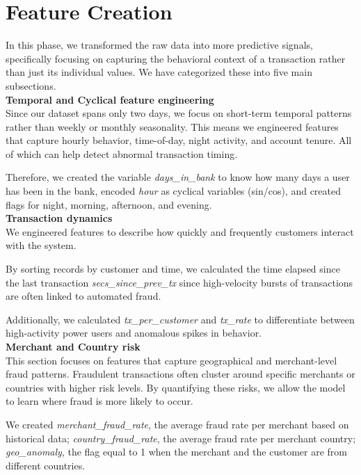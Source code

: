 \documentclass[12pt,a4paper]{report}
\begin{document}
\section{Feature Creation}
In this phase, we transformed the raw data into more predictive signals, specifically focusing on capturing the behavioral context of a transaction rather than just its individual values. We have categorized these into five  main subsections.\\

\textbf{Temporal and Cyclical feature engineering}\\
Since our dataset spans only two days, we focus on short-term temporal patterns rather than weekly or monthly seasonality. This means we engineered features that capture hourly behavior, time-of-day, night activity, and account tenure. All of which can help detect abnormal transaction timing.

Therefore, we created the variable \textit{days\_in\_bank} to know how many days a user has been in the bank, encoded \textit{hour} as cyclical variables (sin/cos), and created flags for night, morning, afternoon, and evening.\\

\textbf{Transaction dynamics}\\
We engineered features to describe how quickly and frequently customers interact with the system.

By sorting records by customer and time, we calculated the time elapsed since the last transaction \textit{secs\_since\_prev\_tx} since high-velocity bursts of transactions are often linked to automated fraud.

Additionally, we calculated  \textit{tx\_per\_customer} and \textit{tx\_rate} to differentiate between high-activity power users and anomalous spikes in behavior.\\

\textbf{Merchant and Country risk}\\
This section focuses on features that capture geographical and merchant-level fraud patterns.
Fraudulent transactions often cluster around specific merchants or countries with higher risk levels. By quantifying these risks, we allow the model to learn where fraud is more likely to occur.

We created \textit{merchant\_fraud\_rate}, the average fraud rate per merchant based on historical data; \textit{country\_fraud\_rate}, the average fraud rate per merchant country; \textit{geo\_anomaly}, the flag equal to 1 when the merchant and the customer are from different countries.\\
\end{document}
